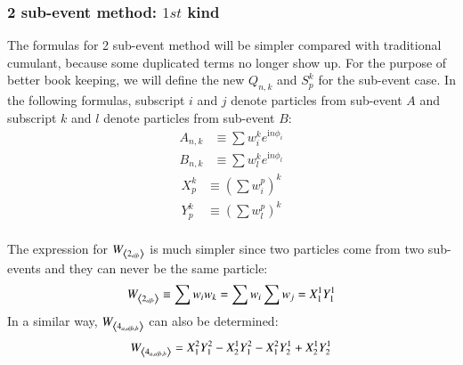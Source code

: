 \subsubsection{2 sub-event method: $1st$ kind}
The formulas for 2 sub-event method will be simpler compared with traditional cumulant, because some duplicated terms no longer show up. For the purpose of better book keeping, we will define the new $Q_{n,k}$ and $S_{p}^{k}$ for the sub-event case. In the following formulas, subscript $i$ and $j$ denote particles from sub-event $A$ and subscript $k$ and $l$ denote particles from sub-event $B$:
\begin{equation}
\begin{split}
A_{n,k}&\equiv \sum w_{i}^{k}e^{\text{i}n\phi_{i}} \\
B_{n,k}&\equiv \sum w_{l}^{k}e^{\text{i}n\phi_{l}}
\end{split}
\end{equation}
\begin{equation}
\begin{split}
X_{p}^{k}&\equiv (\sum w_{i}^{p})^{k} \\
Y_{p}^{k}&\equiv (\sum w_{l}^{p})^{k} \\
\end{split}
\end{equation}

The expression for $W_{\left\langle 2_{a|b}\right\rangle}$ is much simpler since two particles come from two sub-events and they can never be the same particle:
\begin{equation}
W_{\left\langle 2_{a|b}\right\rangle}\equiv \sum w_{i}w_{k} = \sum w_{i} \sum w_{j} = X_{1}^{1}Y_{1}^{1}
\end{equation}
In a similar way, $W_{\left\langle 4_{a,a|b,b}\right\rangle}$ can also be determined:
\begin{equation}
W_{\left\langle 4_{a,a|b,b}\right\rangle} = X_{1}^{2}Y_{1}^{2}-X_{2}^{1}Y_{1}^{2}-X_{1}^{2}Y_{2}^{1}+X_{2}^{1}Y_{2}^{1}
\end{equation}

